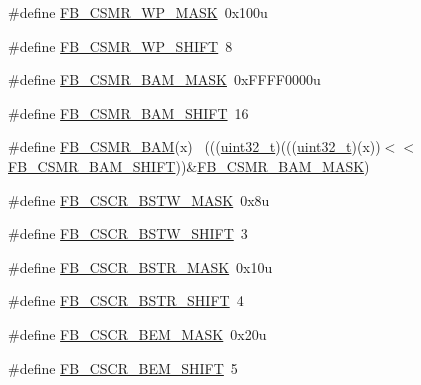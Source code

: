 \begin{DoxyCompactItemize}
\#define \hyperlink{group___f_b___register___masks_ga40725292274706aa0a0c013201498f4b}{F\+B\+\_\+\+C\+S\+M\+R\+\_\+\+W\+P\+\_\+\+M\+A\+SK}~0x100u
\item 
\#define \hyperlink{group___f_b___register___masks_ga6d49da1d3aabbb8619673ac0fba95dd1}{F\+B\+\_\+\+C\+S\+M\+R\+\_\+\+W\+P\+\_\+\+S\+H\+I\+FT}~8
\item 
\#define \hyperlink{group___f_b___register___masks_ga9f7361c70716e7a39579b6418ae2c20c}{F\+B\+\_\+\+C\+S\+M\+R\+\_\+\+B\+A\+M\+\_\+\+M\+A\+SK}~0x\+F\+F\+F\+F0000u
\item 
\#define \hyperlink{group___f_b___register___masks_ga6a99aa1f2614f6287dfa8a83a2ceead4}{F\+B\+\_\+\+C\+S\+M\+R\+\_\+\+B\+A\+M\+\_\+\+S\+H\+I\+FT}~16
\item 
\#define \hyperlink{group___f_b___register___masks_gab94aedc10ef3b8b17b129f69eda436c4}{F\+B\+\_\+\+C\+S\+M\+R\+\_\+\+B\+AM}(x)                                                  ~(((\hyperlink{_p_e___types_8h_a33594304e786b158f3fb30289278f5af}{uint32\+\_\+t})(((\hyperlink{_p_e___types_8h_a33594304e786b158f3fb30289278f5af}{uint32\+\_\+t})(x))$<$$<$\hyperlink{group___f_b___register___masks_ga6a99aa1f2614f6287dfa8a83a2ceead4}{F\+B\+\_\+\+C\+S\+M\+R\+\_\+\+B\+A\+M\+\_\+\+S\+H\+I\+FT}))\&\hyperlink{group___f_b___register___masks_ga9f7361c70716e7a39579b6418ae2c20c}{F\+B\+\_\+\+C\+S\+M\+R\+\_\+\+B\+A\+M\+\_\+\+M\+A\+SK})
\item 
\#define \hyperlink{group___f_b___register___masks_gaee04052f66392a6242d45c0598b8606a}{F\+B\+\_\+\+C\+S\+C\+R\+\_\+\+B\+S\+T\+W\+\_\+\+M\+A\+SK}~0x8u
\item 
\#define \hyperlink{group___f_b___register___masks_ga34341b855043b3fbffcad2811084fec8}{F\+B\+\_\+\+C\+S\+C\+R\+\_\+\+B\+S\+T\+W\+\_\+\+S\+H\+I\+FT}~3
\item 
\#define \hyperlink{group___f_b___register___masks_gac577e626a579979985c559866c940018}{F\+B\+\_\+\+C\+S\+C\+R\+\_\+\+B\+S\+T\+R\+\_\+\+M\+A\+SK}~0x10u
\item 
\#define \hyperlink{group___f_b___register___masks_ga161827d21e9f36d9dc4a42a3fc287dd7}{F\+B\+\_\+\+C\+S\+C\+R\+\_\+\+B\+S\+T\+R\+\_\+\+S\+H\+I\+FT}~4
\item 
\#define \hyperlink{group___f_b___register___masks_gaef7f70f7c6d39c8e1de2a16ccb4b3ccb}{F\+B\+\_\+\+C\+S\+C\+R\+\_\+\+B\+E\+M\+\_\+\+M\+A\+SK}~0x20u
\item 
\#define \hyperlink{group___f_b___register___masks_ga2dd3f47a9401af7ae8838b7dc7c379f8}{F\+B\+\_\+\+C\+S\+C\+R\+\_\+\+B\+E\+M\+\_\+\+S\+H\+I\+FT}~5
\item 
$$
\end{DoxyCompactItemize}
